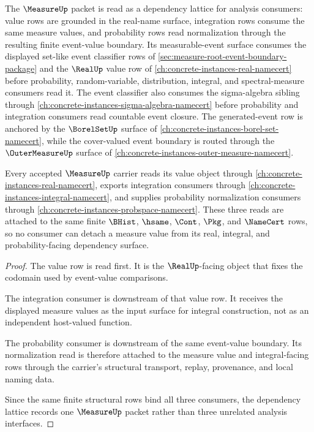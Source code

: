 The $\MeasureUp$ packet is read as a dependency lattice for analysis consumers: value rows are grounded in the real-name surface, integration rows consume the same measure values, and probability rows read normalization through the resulting finite event-value boundary. Its measurable-event surface consumes the displayed set-like event classifier rows of \autoref{sec:measure-root-event-boundary-package} and the $\RealUp$ value row of \autoref{ch:concrete-instances-real-namecert} before probability, random-variable, distribution, integral, and spectral-measure consumers read it. The event classifier also consumes the sigma-algebra sibling through \autoref{ch:concrete-instances-sigma-algebra-namecert} before probability and integration consumers read countable event closure. The generated-event row is anchored by the $\BorelSetUp$ surface of \autoref{ch:concrete-instances-borel-set-namecert}, while the cover-valued event boundary is routed through the $\OuterMeasureUp$ surface of \autoref{ch:concrete-instances-outer-measure-namecert}.

\begin{theorem}
\label{thm:measure-dependency-lattice}
Every accepted $\MeasureUp$ carrier reads its value object through \autoref{ch:concrete-instances-real-namecert}, exports integration consumers through \autoref{ch:concrete-instances-integral-namecert}, and supplies probability normalization consumers through \autoref{ch:concrete-instances-probspace-namecert}. These three reads are attached to the same finite $\BHist$, $\hsame$, $\Cont$, $\Pkg$, and $\NameCert$ rows, so no consumer can detach a measure value from its real, integral, and probability-facing dependency surface.
\end{theorem}
\begin{proof}
The value row is read first. It is the $\RealUp$-facing object that fixes the codomain used by event-value comparisons.

The integration consumer is downstream of that value row. It receives the displayed measure values as the input surface for integral construction, not as an independent host-valued function.

The probability consumer is downstream of the same event-value boundary. Its normalization read is therefore attached to the measure value and integral-facing rows through the carrier's structural transport, replay, provenance, and local naming data.

Since the same finite structural rows bind all three consumers, the dependency lattice records one $\MeasureUp$ packet rather than three unrelated analysis interfaces.
\end{proof}

